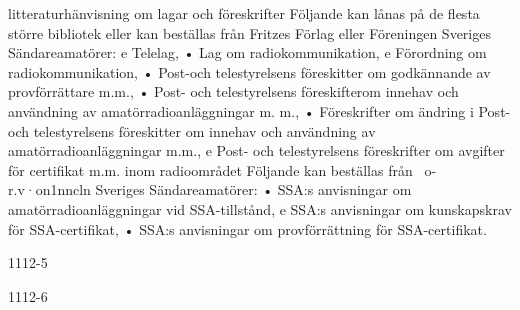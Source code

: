 litteraturhänvisning om lagar och föreskrifter
Följande kan lånas på de flesta större bibliotek eller kan beställas från Fritzes Förlag
eller Föreningen Sveriges Sändareamatörer:
e Telelag,
• Lag om radiokommunikation,
e Förordning om radiokommunikation,
• Post-och telestyrelsens föreskitter om godkännande av provförrättare m.m.,
• Post- och telestyrelsens föreskifterom innehav och användning av amatörradioanläggningar m. m.,
• Föreskrifter om ändring i Post- och telestyrelsens föreskitter om innehav och användning av amatörradioanläggningar
m.m.,
e Post- och telestyrelsens föreskrifter om
avgifter för certifikat m.m. inom radioområdet
Följande kan beställas från
~o-r.v·on1nncln Sveriges Sändareamatörer:
• SSA:s anvisningar om amatörradioanläggningar vid SSA-tillstånd,
e SSA:s anvisningar om kunskapskrav för
SSA-certifikat,
• SSA:s anvisningar om provförrättning för
SSA-certifikat.

1112-5


1112-6

